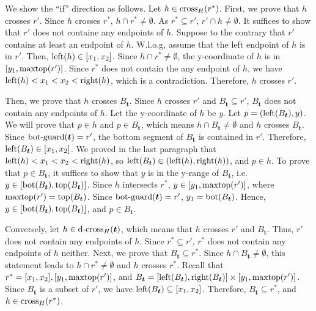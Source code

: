 \vgap 

We show the ``if'' direction as follows. Let $h\in \mathrm{cross}_H(r^*)$. First, we prove that $h$ crosses $r'$. Since $h$ crosses $r^*$, $h \cap r^* \neq \emptyset$. As $r^* \subseteq r'$, $r'\cap h \neq \emptyset$. It suffices to show that $r'$ does not containe any endpoints of $h$.
Suppose to the contrary that $r'$ contains at least an endpoint of $h$. W.l.o.g, assume that the left endpoint of $h$ is in $r'$.
Then, $\mathrm{left}(h)\in[x_1,x_2]$. Since $h\cap r^*\neq \emptyset$, the y-coordinate of $h$ is in $[y_1,\mathrm{maxtop}(r')]$. Since $r^*$ does not contain the any endpoint of $h$, we have $\mathrm{left}(h)<x_1<x_2<\mathrm{right}(h)$, 
which is a contradiction. Therefore, $h$ crosses $r'$.  

\vgap 

Then, we prove that $h$ crosses $B_{\bm{t}}$. Since $h$ crosses $r'$ and $B_{\bm{t}}\subseteq r'$, $B_{\bm{t}}$ does not contain any endpoints of $h$. Let the y-coordinate of $h$ be $y$. Let $p = (\mathrm{left}(B_{\textrm{\boldmath${t}$}}), y)$. We will prove that $p \in h$ and $p \in B_{\bm{t}}$, which means $h\cap B_{\bm{t}} \neq \emptyset$ and $h$ crosses $B_{\bm{t}}$. Since $\mathrm{bot\text{-}guard}(\textrm{\boldmath${t}$}) = r'$, the bottom segment of $B_{\bm{t}}$ is contained in $r'$. Therefore,  
$\mathrm{left}(B_{\textrm{\boldmath${t}$}})\in [x_1,x_2]$. We proved in the last paragraph that $\mathrm{left}(h)<x_1<x_2<\mathrm{right}(h)$, so  $\mathrm{left}(B_{\textrm{\boldmath${t}$}}) \in (\mathrm{left}(h),\mathrm{right}(h))$, and $p\in h$. To prove that $p\in B_{\bm{t}}$, it suffices to show that $y$ is in the y-range of $B_{\bm{t}}$, i.e. $y \in [\mathrm{bot}(B_{\textrm{\boldmath${t}$}}), \mathrm{top}(B_{\textrm{\boldmath${t}$}})]$.
 Since $h$ intersects $r^*$, $y \in [y_1 , \mathrm{maxtop}(r')]$, where $\mathrm{maxtop}(r') = \mathrm{top}(B_{\textrm{\boldmath${t}$}})$. Since $\mathrm{bot\text{-}guard}(\textrm{\boldmath${t}$}) = r'$, $y_1 = \mathrm{bot}(B_{\textrm{\boldmath${t}$}})$. Hence, $y\in [\mathrm{bot}(B_{\textrm{\boldmath${t}$}}), \mathrm{top}(B_{\textrm{\boldmath${t}$}})]$, and $p\in B_{\bm{t}}$.  

\vgap 

Conversely, let $h\in \mathrm{d\text{-}cross}_H(\textrm{\boldmath${t}$})$, which means that $h$ crosses $r'$ and $B_{\bm{t}}$. Thus, $r'$ does not contain any endpoints of $h$. Since $r^*\subseteq r'$, $r^*$ does not contain any endpoints of $h$ neither. 
Next, we prove that $B_{\bm{t}} \subseteq r^*$. Since $h \cap B_{\bm{t}}\neq \emptyset$, this statement leads to $h \cap r^* \neq \emptyset$ and $h$ crosses $r^*$. Recall that $r^* = [x_1,x_2], [y_1, \mathrm{maxtop}(r')]$, and $B_{\textrm{\boldmath${t}$}} = [\mathrm{left}(B_{\textrm{\boldmath${t}$}}), \mathrm{right}(B_{\textrm{\boldmath${t}$}})]\times [y_1,\mathrm{maxtop}(r')]$. Since $B_{\bm{t}}$ is a subset of $r'$, we have $\mathrm{left}(B_{\textrm{\boldmath${t}$}}) \subseteq [x_1,x_2]$. Therefore, $B_{\bm{t}} \subseteq r^*$, and $h\in \mathrm{cross}_H(r^*)$. 

